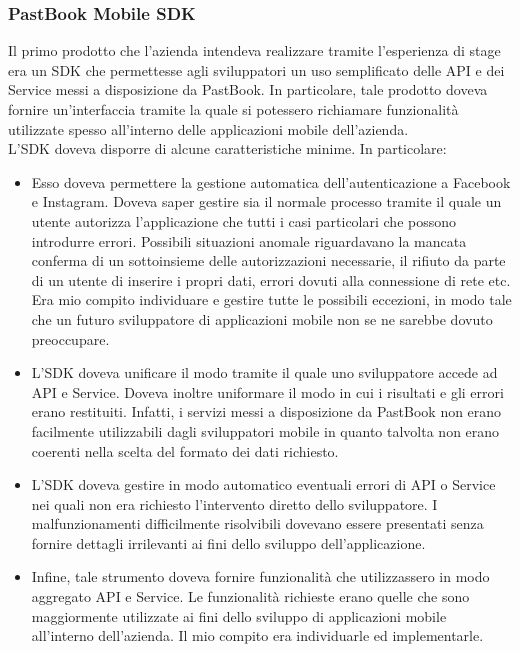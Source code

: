			\subsubsection{PastBook Mobile SDK}
				Il primo prodotto che l'azienda intendeva realizzare tramite l'esperienza di stage era un SDK che permettesse agli
				sviluppatori un uso semplificato delle API e dei Service messi a disposizione da PastBook. In particolare, tale
				prodotto doveva fornire un'interfaccia tramite la quale si potessero richiamare funzionalità utilizzate spesso
				all'interno delle applicazioni mobile dell'azienda.\\
				L'SDK doveva disporre di alcune caratteristiche minime. In particolare:
				\begin{itemize}
					\item Esso doveva permettere la gestione automatica dell'autenticazione a Facebook e Instagram. Doveva saper
					gestire sia il normale processo tramite il quale un utente autorizza l'applicazione che tutti i casi
					particolari che possono introdurre errori. Possibili situazioni anomale riguardavano la mancata conferma di
					un sottoinsieme delle autorizzazioni necessarie, il rifiuto da parte di un utente di inserire i propri dati,
					errori dovuti alla connessione di rete etc. Era mio compito individuare e gestire tutte le possibili
					eccezioni, in modo tale che un futuro sviluppatore di applicazioni mobile non se ne sarebbe dovuto
					preoccupare.
					\item L'SDK doveva unificare il modo tramite il quale uno sviluppatore accede ad API e Service. Doveva
					inoltre uniformare il modo in cui i risultati e gli errori erano restituiti. Infatti, i servizi messi a
					disposizione da PastBook non erano facilmente utilizzabili dagli sviluppatori mobile in quanto talvolta non
					erano coerenti nella scelta del formato dei dati richiesto.
					\item L'SDK doveva gestire in modo automatico eventuali errori di API o Service nei quali non era richiesto
					l'intervento diretto dello sviluppatore. I malfunzionamenti difficilmente risolvibili dovevano essere
					presentati senza fornire dettagli irrilevanti ai fini dello sviluppo dell'applicazione.
					\item Infine, tale strumento doveva fornire funzionalità che utilizzassero in modo aggregato API e Service.
					Le funzionalità richieste erano quelle che sono maggiormente utilizzate ai fini dello sviluppo di 
					applicazioni mobile all'interno dell'azienda. Il mio compito era individuarle ed implementarle.
				\end{itemize}
